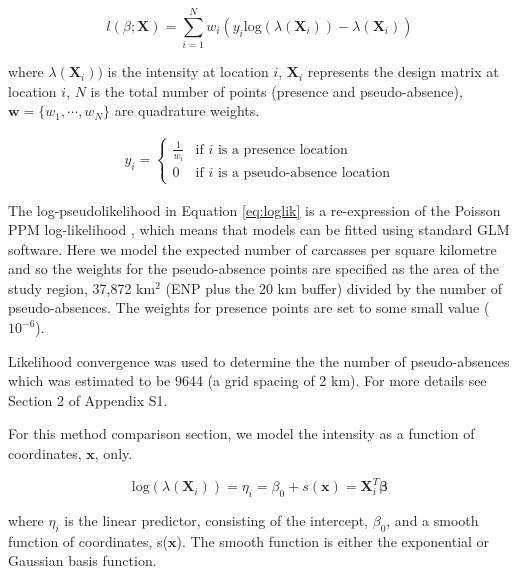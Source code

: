 \documentclass[letterpaper, 12pt]{interact}
\begin{document}
	\begin{equation}\label{eq:loglik}
		l(\beta;\textbf{X}) = \sum_{i=1}^{N}w_i(y_i \textrm{log}(\lambda(\textbf{X}_i)) - \lambda (\textbf{X}_i))
	\end{equation}
	
	where \(\lambda(\textbf{X}_i))\) is the intensity at location \(i\),  $\boldsymbol{X}_i$ represents the design matrix at location $i$, $N$ is the total number of points (presence and pseudo-absence), $\textbf{w} = \{w_1, \cdots, w_N\}$ are quadrature weights.
	
	\begin{align*}
		y_i = \begin{cases}
			\frac{1}{w_i} & \text{if $i$ is a presence location}\\
			0 & \text{if $i$ is a pseudo-absence location}
		\end{cases} 
	\end{align*}
	
	The log-pseudolikelihood in Equation \ref{eq:loglik} \cite{Berman1992} is a re-expression of the Poisson PPM log-likelihood \cite{cressie1993}, which means that models can be fitted using standard GLM software.  Here we model the expected number of carcasses per square kilometre and so the weights for the pseudo-absence points are specified as the area of the study region, 37,872 km$^2$ (ENP plus the 20 km buffer) divided by the number of pseudo-absences. The weights for presence points are set to some small value ($10^{-6}$).
	
	Likelihood convergence was used to determine the the number of pseudo-absences which was estimated to be 9644 (a grid spacing of 2 km). For more details see Section 2 of Appendix S1. 
	
	
	For this method comparison section, we model the intensity as a function of coordinates, $\mathbf{x}$, only.
	
	\begin{equation}\label{eq:modcompeq}
		\textrm{log}(\lambda(\textbf{X}_i)) = \eta_{i} = \beta_0 + s(\mathbf{x})=\boldsymbol{X}_i^T \boldsymbol{\beta}
	\end{equation}
	
	where \(\eta_i\) is the linear predictor, consisting of the intercept, \(\beta_0\), and a smooth function of coordinates, s($\mathbf{x}$). The smooth function is either the exponential or Gaussian basis function.
	
\end{document}
